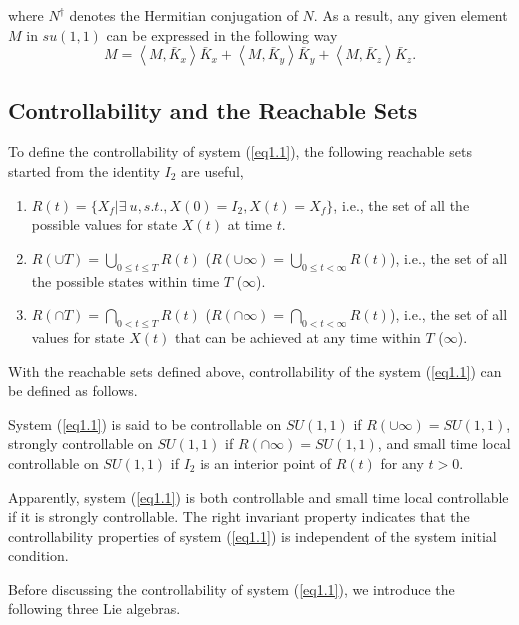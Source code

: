 \documentclass[onecolumn,showpacs,showkeys,preprintnumbers]{revtex4}
\begin{document}
\noindent where $N^\dag$ denotes the Hermitian conjugation of $N$.
As a result, any given element $M$ in $su(1,1)$ can be expressed
in the
following way\noindent\begin{equation}\label{eq2.1.7}
M=\left<M,\bar{K}_x\right>\bar{K}_x+\left<M,\bar{K}_y\right>\bar{K}_y+\left<M,\bar{K}_z\right>\bar{K}_z.
\end{equation}

\subsection{Controllability and the Reachable Sets}\label{sec2.2}

To define the controllability of system (\ref{eq1.1}), the
following reachable sets started from the identity $I_2$ are
useful,

\noindent\begin{enumerate}    \item $R(t)=\{X_f|\exists~u, s.t., X(0)=I_2, X(t)=X_f\}$, i.e., the set of all the possible values for state
    $X(t)$ at time $t$.
    \item $R(\cup{T})=\bigcup_{0\leq{t}\leq{T}}R(t)$
    ($R(\cup{\infty})=\bigcup_{0\leq{t}<\infty}R(t)$), i.e.,
    the set of all the possible states
    within time $T$ ($\infty$).
    \item $R(\cap{T})=\bigcap_{0<{t}\leq{T}}R(t)$
    ($R(\cap{\infty})=\bigcap_{0<{t}<\infty}R(t)$), i.e.,
    the set of all values for state $X(t)$ that can be achieved
    at any time within $T$ ($\infty$).
\end{enumerate}

With the reachable sets defined above, controllability of the
system (\ref{eq1.1}) can be defined as follows.

 System (\ref{eq1.1}) is said to be
controllable on $SU(1,1)$ if $R(\cup{\infty})=SU(1,1)$, strongly
controllable on $SU(1,1)$ if $R(\cap{\infty})=SU(1,1)$, and small
time local controllable on $SU(1,1)$ if $I_2$ is an interior point
of $R(t)$ for any $t>0$.

Apparently, system (\ref{eq1.1}) is both controllable and small
time local controllable if it is strongly controllable. The right
invariant property indicates that the controllability properties
of system (\ref{eq1.1}) is independent of the system initial
condition.

Before discussing the controllability of system (\ref{eq1.1}), we
introduce the following three Lie algebras.
\end{document}
